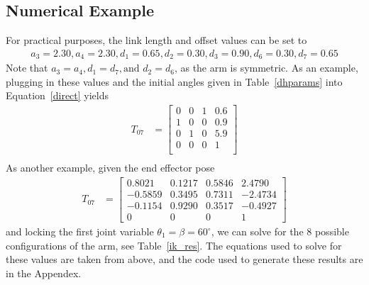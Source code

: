 \documentclass{article}
\begin{document}
\subsection{Numerical Example}
For practical purposes, the link length and offset values can be set to
\begin{align*}
a_{3} = 2.30, a_{4} = 2.30, d_{1} = 0.65, d_{2} = 0.30, d_{3} = 0.90, d_{6} = 0.30, d_{7} = 0.65
\end{align*}
Note that $a_3=a_4, d_1=d_7, \text{and } d_2=d_6$, as the arm is symmetric.
As an example, plugging in these values and the initial angles given in Table~\ref{dhparams} into Equation~\ref{direct} yields
\begin{align*}
T_{07} &=
\left[\begin{matrix}
0 & 0 & 1 & 0.6 \\
1 & 0 & 0 & 0.9 \\
0 & 1 & 0 & 5.9 \\
0 & 0 & 0 &   1 \\
\end{matrix}\right] \\
\end{align*}
As another example, given the end effector pose
\begin{align*}
T_{07} &=
\left[\begin{matrix}
0.8021 & 0.1217 & 0.5846 & 2.4790 \\
-0.5859 & 0.3495 & 0.7311 & -2.4734 \\
-0.1154 & 0.9290 & 0.3517 & -0.4927 \\
0 & 0 & 0 & 1
\end{matrix}\right]
\end{align*}
and locking the first joint variable $\theta_1 = \beta = 60^\circ$, we can solve for the 8 possible configurations of the arm, see Table~\ref{ik_res}.
The equations used to solve for these values are taken from above, and the code used to generate these results are in the Appendex.
\end{document}
